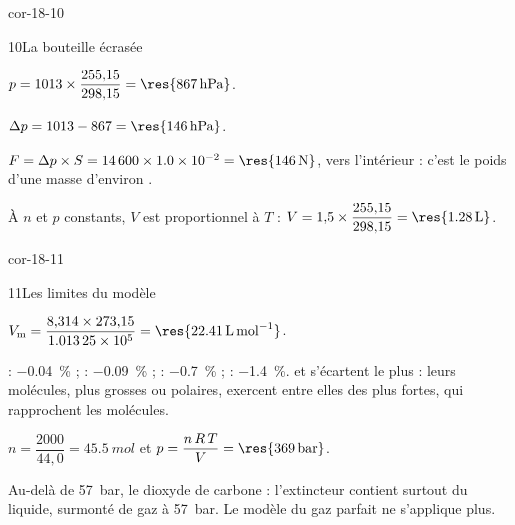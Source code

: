 \begin{blocLivre}{cor-18-10}
\begin{corrige}{10}{La bouteille écrasée}
\begin{questions}
\item $p=1013\times\dfrac{255{,}15}{298{,}15}=\res{\qty{867}{hPa}}$.
\item $\Delta p=1013-867=\res{\qty{146}{hPa}}$.
\item $F=\Delta p\times S=\num{14600}\times\num{1.0e-2}=\res{\qty{146}{N}}$, vers l'intérieur : c'est le poids d'une masse
d'environ .
\item À $n$ et $p$ constants, $V$ est proportionnel à $T$ : $V=1{,}5\times\dfrac{255{,}15}{298{,}15}=\res{\qty{1,28}{L}}$.
\end{questions}
\end{corrige}
\end{blocLivre}
\begin{blocLivre}{cor-18-11}
\begin{corrige}{11}{Les limites du modèle}
\begin{questions}
\item $V_\mathrm{m}=\dfrac{8{,}314\times273{,}15}{\num{1.01325e5}}=\res{\qty{22,41}{L.mol^{-1}}}$.
\item {} : \qty{-0,04}{\percent} ;  : \qty{-0,09}{\percent} ;  : \qty{-0,7}{\percent} ;  : \qty{-1,4}{\percent}.
 et  s'écartent le plus : leurs molécules, plus grosses ou polaires, exercent entre elles des
 plus fortes, qui rapprochent les molécules.
\item $n=\dfrac{2000}{44{,}0}=\qty{45,5}{mol}$ et $p=\dfrac{n\,R\,T}{V}=\res{\qty{369}{bar}}$.
\item Au-delà de \qty{57}{bar}, le dioxyde de carbone  : l'extincteur contient surtout du liquide,
surmonté de gaz à \qty{57}{bar}. Le modèle du gaz parfait ne s'applique plus.
\end{questions}
\end{corrige}
\end{blocLivre}
